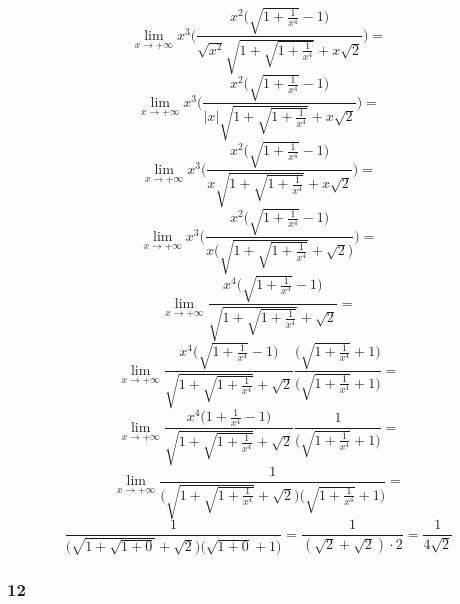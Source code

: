 \documentclass{article}
\begin{document}
\begin{equation*}
    \lim_{x \to + \infty} x^{3} \Bigg(\frac{ x^2 \Big(\sqrt{1 + \frac{1}{x^4}} - 1 \Big)}{\sqrt{x^{2}} \sqrt{1 + \sqrt{1 + \frac{1}{x^4}}} + x\sqrt{2}}\Bigg) =
\end{equation*}
\begin{equation*}
    \lim_{x \to + \infty} x^{3} \Bigg(\frac{ x^2 \Big(\sqrt{1 + \frac{1}{x^4}} - 1 \Big)}{|x| \sqrt{1 + \sqrt{1 + \frac{1}{x^4}}} + x\sqrt{2}}\Bigg) =
\end{equation*}
\begin{equation*}
    \lim_{x \to + \infty} x^{3} \Bigg(\frac{ x^2 \Big(\sqrt{1 + \frac{1}{x^4}} - 1 \Big)}{x \sqrt{1 + \sqrt{1 + \frac{1}{x^4}}} + x\sqrt{2}}\Bigg) =
\end{equation*}
\begin{equation*}
    \lim_{x \to + \infty} x^{3} \Bigg(\frac{ x^2 \Big(\sqrt{1 + \frac{1}{x^4}} - 1 \Big)}{x \Bigg(\sqrt{1 + \sqrt{1 + \frac{1}{x^4}}} + \sqrt{2}\Bigg)}\Bigg) =
\end{equation*}
\begin{equation*}
    \lim_{x \to + \infty}  \frac{ x^{4} \Big(\sqrt{1 + \frac{1}{x^4}} - 1 \Big)}{\sqrt{1 + \sqrt{1 + \frac{1}{x^4}}} + \sqrt{2}} =
\end{equation*}
\begin{equation*}
    \lim_{x \to + \infty}  \frac{ x^{4} \Big(\sqrt{1 + \frac{1}{x^4}} - 1 \Big)}{\sqrt{1 + \sqrt{1 + \frac{1}{x^4}}} + \sqrt{2}}\frac{\Big(\sqrt{1 + \frac{1}{x^4}} + 1 \Big)}{\Big(\sqrt{1 + \frac{1}{x^4}} + 1 \Big)} =
\end{equation*}
\begin{equation*}
    \lim_{x \to + \infty}  \frac{ x^{4} \Big(1 + \frac{1}{x^4} - 1 \Big)}{\sqrt{1 + \sqrt{1 + \frac{1}{x^4}}} + \sqrt{2}}\frac{1}{\Big(\sqrt{1 + \frac{1}{x^4}} + 1 \Big)} =
\end{equation*}
\begin{equation*}
    \lim_{x \to + \infty}  \frac{ 1}{\Big(\sqrt{1 + \sqrt{1 + \frac{1}{x^4}}} + \sqrt{2}\Big) \Big(\sqrt{1 + \frac{1}{x^4}} + 1 \Big)} =
\end{equation*}
\begin{equation*}
    \frac{ 1}{\Big(\sqrt{1 + \sqrt{1 + 0}} + \sqrt{2}\Big) \Big(\sqrt{1 + 0} + 1 \Big)} = \frac{1}{(\sqrt{2} + \sqrt{2}) \cdot 2} = \frac{1}{4\sqrt{2}} 
\end{equation*}

\subsubsection*{12}
\end{document}

